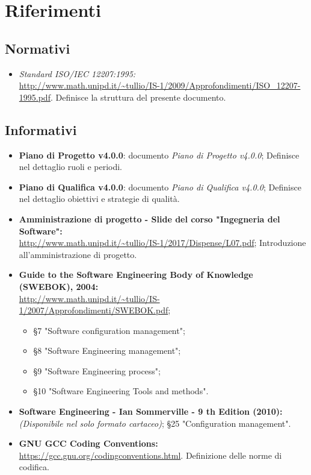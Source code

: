 \documentclass[./NormediProgetto.tex]{subfiles}
\begin{document}
\section{Riferimenti}

\subsection*{Normativi}

\begin{itemize}
	\item \textit{Standard ISO/IEC 12207:1995:}\\
	 \url{http://www.math.unipd.it/~tullio/IS-1/2009/Approfondimenti/ISO_12207-1995.pdf}.
	 \subitem Definisce la struttura del presente documento.
\end{itemize}

\subsection*{Informativi}

\begin{itemize}
	\item \textbf{Piano di Progetto v4.0.0}: documento \textit{Piano di Progetto v4.0.0};
		\subitem Definisce nel dettaglio ruoli e periodi.
	\item \textbf{Piano di Qualifica v4.0.0}: documento \textit{Piano di Qualifica v4.0.0};
		\subitem Definisce nel dettaglio obiettivi e strategie di qualità.
	\item \textbf{Amministrazione di progetto - Slide del corso "Ingegneria del Software":}\\	\url{http://www.math.unipd.it/~tullio/IS-1/2017/Dispense/L07.pdf};
		\subitem Introduzione all'amministrazione di progetto.
	\item \textbf{Guide to the Software Engineering Body of Knowledge (SWEBOK), 2004:}\\
	\url{http://www.math.unipd.it/~tullio/IS-1/2007/Approfondimenti/SWEBOK.pdf}; 
		\begin{itemize}
			\item §7 "Software configuration management";
			\item §8 "Software Engineering management";
			\item §9 "Software Engineering process";
			\item §10 "Software Engineering Tools and methods".
		\end{itemize}
	\item \textbf{Software Engineering - Ian Sommerville - 9 th Edition (2010):}
		\subitem \textit{(Disponibile nel solo formato cartaceo)};
		\subitem §25 "Configuration management".
	\item \textbf{GNU GCC Coding Conventions:}\\ \url{https://gcc.gnu.org/codingconventions.html}.
		\subitem Definizione delle norme di codifica.
\end{itemize}
\end{document}
